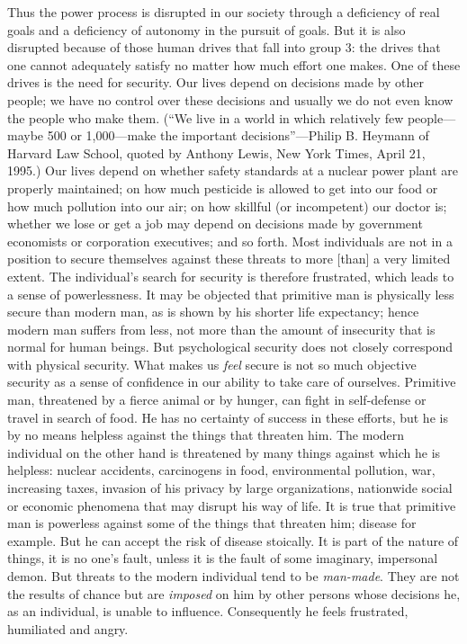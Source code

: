  Thus the power process is disrupted in our society through a deficiency of real goals and a deficiency of autonomy in the pursuit of goals. But it is also disrupted because of those human drives that fall into group 3: the drives that one cannot adequately satisfy no matter how much effort one makes. One of these drives is the need for security. Our lives depend on decisions made by other people; we have no control over these decisions and usually we do not even know the people who make them. (“We live in a world in which relatively few people—maybe 500 or 1,000—make the important decisions”—Philip B. Heymann of Harvard Law School, quoted by Anthony Lewis, New York Times, April 21, 1995.) Our lives depend on whether safety standards at a nuclear power plant are properly maintained; on how much pesticide is allowed to get into our food or how much pollution into our air; on how skillful (or incompetent) our doctor is; whether we lose or get a job may depend on decisions made by government economists or corporation executives; and so forth. Most individuals are not in a position to secure themselves against these threats to more [than] a very limited extent. The individual’s search for security is therefore frustrated, which leads to a sense of powerlessness.\break
{} It may be objected that primitive man is physically less secure than modern man, as is shown by his shorter life expectancy; hence modern man suffers from less, not more than the amount of insecurity that is normal for human beings. But psychological security does not closely correspond with physical security. What makes us {\em feel} secure is not so much objective security as a sense of confidence in our ability to take care of ourselves. Primitive man, threatened by a fierce animal or by hunger, can fight in self-defense or travel in search of food. He has no certainty of success in these efforts, but he is by no means helpless against the things that threaten him. The modern individual on the other hand is threatened by many things against which he is helpless: nuclear accidents, carcinogens in food, environmental pollution, war, increasing taxes, invasion of his privacy by large organizations, nationwide social or economic phenomena that may disrupt his way of life.
 It is true that primitive man is powerless against some of the things that threaten him; disease for example. But he can accept the risk of disease stoically. It is part of the nature of things, it is no one’s fault, unless it is the fault of some imaginary, impersonal demon. But threats to the modern individual tend to be {\em man-made}. They are not the results of chance but are {\em imposed} on him by other persons whose decisions he, as an individual, is unable to influence. Consequently he feels frustrated, humiliated and angry.
